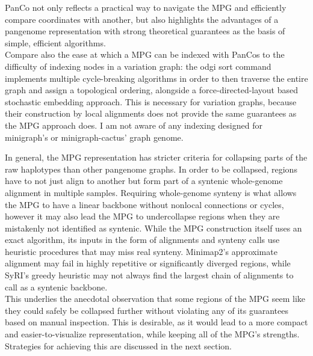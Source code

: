 PanCo not only reflects a practical way to navigate the MPG and efficiently compare coordinates with another, but also highlights the advantages of a pangenome representation with strong theoretical guarantees as the basis of simple, efficient algorithms.\\
Compare also the ease at which a MPG can be indexed with PanCos to the difficulty of indexing nodes in a variation graph: the odgi sort command implements multiple cycle-breaking algorithms in order to then traverse the entire graph and assign a topological ordering, alongside a force-directed-layout based stochastic embedding approach\cite{guarracino22}.
This is necessary for variation graphs, because their construction by local alignments does not provide the same guarantees as the MPG approach does.
I am not aware of any indexing designed for minigraph's or minigraph-cactus' graph genome. %


In general, the MPG representation has stricter criteria for collapsing parts of the raw haplotypes than other pangenome graphs.
In order to be collapsed, regions have to not just align to another but form part of a syntenic whole-genome alignment in multiple samples.
Requiring whole-genome synteny is what allows the MPG to have a linear backbone without nonlocal connections or cycles, however it may also lead the MPG to undercollapse regions when they are mistakenly not identified as syntenic.
While the MPG construction itself uses an exact algorithm, %
its inputs in the form of alignments and synteny calls use heuristic procedures that may miss real synteny.
Minimap2's approximate alignment may fail in highly repetitive or significantly diverged regions, while SyRI's greedy heuristic may not always find the largest chain of alignments to call as a syntenic backbone.\\
This underlies the anecdotal observation that some regions of the MPG seem like they could safely be collapsed further without violating any of its guarantees based on manual inspection.
This is desirable, as it would lead to a more compact and easier-to-visualize representation, while keeping all of the MPG's strengths.
Strategies for achieving this are discussed in the next section.

